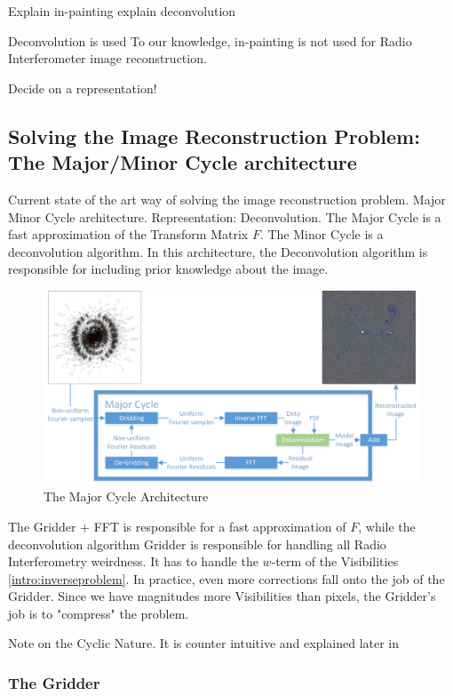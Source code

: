 Explain in-painting
explain deconvolution

Deconvolution is used
To our knowledge, in-painting is not used for Radio Interferometer image reconstruction.

Decide on a representation!




\subsection{Solving the Image Reconstruction Problem: The Major/Minor Cycle architecture}
Current state of the art way of solving the image reconstruction problem. Major Minor Cycle architecture.
Representation: Deconvolution.
The Major Cycle is a fast approximation of the Transform Matrix $F$.
The Minor Cycle is a deconvolution algorithm. In this architecture, the Deconvolution algorithm is responsible for including prior knowledge about the image.

\begin{figure}[h]
	\centering
	\includegraphics[width=0.80\linewidth]{./chapters/02.hypo/Major-Minor3.png}
	\caption{The Major Cycle Architecture}
	\label{intro:major}
\end{figure}

The Gridder + FFT is responsible for a fast approximation of $F$, while the deconvolution algorithm
Gridder is responsible for handling all Radio Interferometry weirdness. It has to handle the $w$-term of the Visibilities \eqref{intro:inverseproblem}. In practice, even more corrections fall onto the job of the Gridder. Since we have magnitudes more Visibilities than pixels, the Gridder's job is to "compress" the problem.

Note on the Cyclic Nature. It is counter intuitive and explained later in 

\subsubsection{The Gridder}


